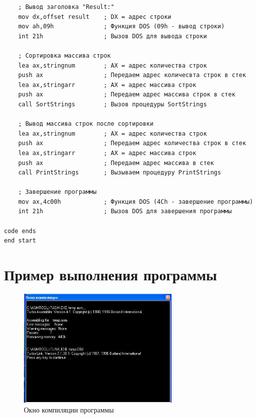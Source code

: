 \documentclass[a4paper,14pt]{article}
\begin{document}
\begin{lstlisting}
    ; Вывод заголовка "Result:"
    mov dx,offset result    ; DX = адрес строки
    mov ah,09h              ; Функция DOS (09h - вывод строки)
    int 21h                 ; Вызов DOS для вывода строки

    ; Сортировка массива строк
    lea ax,stringnum        ; AX = адрес количества строк
    push ax                 ; Передаем адрес количесвта строк в стек
    lea ax,stringarr        ; AX = адрес массива строк
    push ax                 ; Передаем адрес массива строк в стек
    call SortStrings        ; Вызов процедуры SortStrings

    ; Вывод массива строк после сортировки
    lea ax,stringnum        ; AX = адрес количества строк
    push ax                 ; Передаем адрес количества строк в стек
    lea ax,stringarr        ; AX = адрес массива строк
    push ax                 ; Передаем адрес массива в стек
    call PrintStrings       ; Вызываем процедуру PrintStrings

    ; Завершение программы
    mov ax,4c00h            ; Функция DOS (4Ch - завершение программы)
    int 21h                 ; Вызов DOS для завершения программы

code ends
end start
\end{lstlisting}

\newpage

\section{Пример выполнения программы}

\begin{figure}[h] %
    \centering %
    \includegraphics[width=0.7\textwidth]{compiler.jpg} %
    \caption{Окно компиляции программы} %
    \label{fig:compiler} %
\end{figure}
\end{document}
